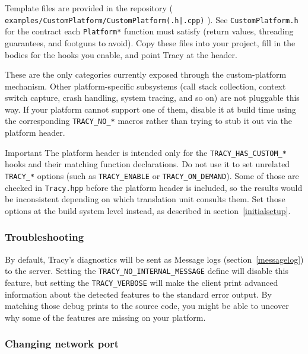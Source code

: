 \documentclass[hidelinks,titlepage,a4paper,twoside]{article}
\begin{document}
Template files are provided in the repository ( \texttt{examples/CustomPlatform/CustomPlatform(.h|.cpp)} ). See \texttt{CustomPlatform.h} for the contract each \texttt{Platform*} function must satisfy (return values, threading guarantees, and footguns to avoid). Copy these files into your project, fill in the bodies for the hooks you enable, and point Tracy at the header.

These are the only categories currently exposed through the custom-platform mechanism. Other platform-specific subsystems (call stack collection, context switch capture, crash handling, system tracing, and so on) are not pluggable this way. If your platform cannot support one of them, disable it at build time using the corresponding \texttt{TRACY\_NO\_*} macros rather than trying to stub it out via the platform header.

\begin{bclogo}[
noborder=true,
couleur=black!5,
logo=\bcbombe
]{Important}
The platform header is intended only for the \texttt{TRACY\_HAS\_CUSTOM\_*} hooks and their matching function declarations. Do not use it to set unrelated \texttt{TRACY\_*} options (such as \texttt{TRACY\_ENABLE} or \texttt{TRACY\_ON\_DEMAND}). Some of those are checked in \texttt{Tracy.hpp} before the platform header is included, so the results would be inconsistent depending on which translation unit consults them. Set those options at the build system level instead, as described in section~\ref{initialsetup}.
\end{bclogo}

\subsubsection{Troubleshooting}
\label{troubleshooting}

By default, Tracy's diagnostics will be sent as Message logs (section~\ref{messagelog}) to the server.
Setting the \texttt{TRACY\_NO\_INTERNAL\_MESSAGE} define will disable this feature, but setting the \texttt{TRACY\_VERBOSE} will make the client print advanced information about the detected features to the standard error output. By matching those debug prints to the source code, you might be able to uncover why some of the features are missing on your platform.

\subsubsection{Changing network port}
\end{document}
